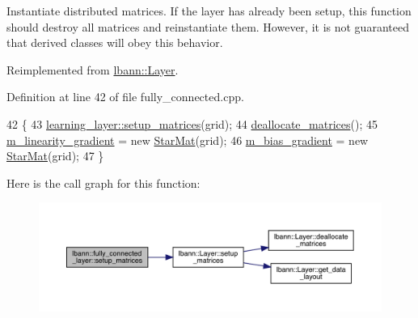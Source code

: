Instantiate distributed matrices. If the layer has already been setup, this function should destroy all matrices and reinstantiate them. However, it is not guaranteed that derived classes will obey this behavior. 

Reimplemented from \hyperlink{classlbann_1_1Layer_a57bbe21131dc00ab5cf9ea5e3656808e}{lbann\+::\+Layer}.



Definition at line 42 of file fully\+\_\+connected.\+cpp.


\begin{DoxyCode}
42                                      \{
43   \hyperlink{classlbann_1_1Layer_a57bbe21131dc00ab5cf9ea5e3656808e}{learning\_layer::setup\_matrices}(grid);
44   \hyperlink{classlbann_1_1fully__connected__layer_a91f359a41cfbab6f21bd67bccb8409b1}{deallocate\_matrices}();
45   \hyperlink{classlbann_1_1fully__connected__layer_ab80f9cb94662ce4d90aa6d8b5cfa0803}{m\_linearity\_gradient} = \textcolor{keyword}{new} \hyperlink{base_8hpp_aba08580d21767b53d0737e115d738dbe}{StarMat}(grid);
46   \hyperlink{classlbann_1_1fully__connected__layer_a6510917c573378f40789a1d16db22b4e}{m\_bias\_gradient} = \textcolor{keyword}{new} \hyperlink{base_8hpp_aba08580d21767b53d0737e115d738dbe}{StarMat}(grid);
47 \}
\end{DoxyCode}
Here is the call graph for this function\+:\nopagebreak
\begin{figure}[H]
\begin{center}
\leavevmode
\includegraphics[width=350pt]{classlbann_1_1fully__connected__layer_a9af60f901a84d5604badf078ecbae082_cgraph}
\end{center}
\end{figure}
\mbox{\label{classlbann_1_1fully__connected__layer_a4f26e5923a82f11c2c7658a27903f83b}} 
